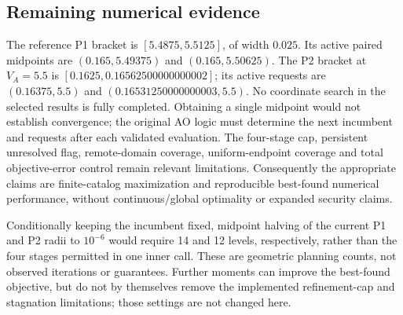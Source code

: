 \subsection{Remaining numerical evidence}
The reference P1 bracket is $[5.4875,5.5125]$, of width $0.025$.
Its active paired midpoints are $(0.165,5.49375)$ and $(0.165,5.50625)$.
The P2 bracket at $V_A=5.5$ is $[0.1625,0.16562500000000002]$;
its active requests are $(0.16375,5.5)$ and
$(0.16531250000000003,5.5)$. No coordinate search in the selected results is
fully completed. Obtaining a single midpoint would not establish convergence;
the original AO logic must determine the next incumbent and requests after
each validated evaluation. The four-stage cap, persistent unresolved flag,
remote-domain coverage, uniform-endpoint coverage and total objective-error
control remain relevant limitations. Consequently the appropriate claims are
finite-catalog maximization and reproducible best-found numerical performance,
without continuous/global optimality or expanded security claims.

Conditionally keeping the incumbent fixed, midpoint halving of the current P1
and P2 radii to $10^{-6}$ would require 14 and 12 levels, respectively, rather
than the four stages permitted in one inner call. These are geometric planning
counts, not observed iterations or guarantees. Further moments can improve the
best-found objective, but do not by themselves remove the implemented
refinement-cap and stagnation limitations; those settings are not changed here.
